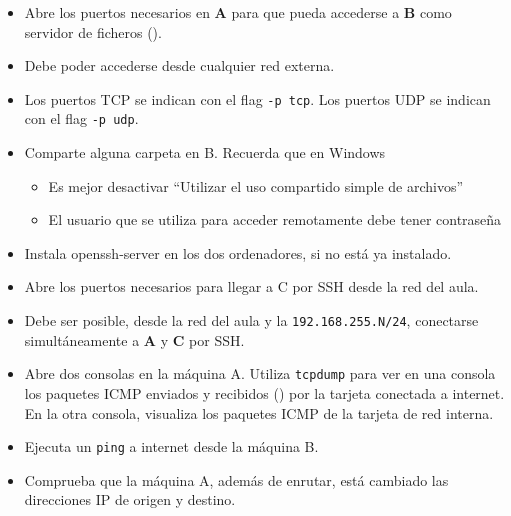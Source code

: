 \begin{homeworkProblem}
  \begin{itemize}
  \item Abre los puertos necesarios en \textbf{A} para que pueda accederse a \textbf{B} como servidor de ficheros ().
  \item Debe poder accederse desde cualquier red externa.
  \item  Los puertos TCP se indican con el flag \texttt{-p tcp}. Los puertos UDP se indican con el flag \texttt{-p udp}.
    
  \item Comparte alguna carpeta en B. Recuerda que en Windows
    \begin{itemize}
    \item Es mejor desactivar “Utilizar el uso compartido simple de archivos”
    \item El usuario que se utiliza para acceder remotamente debe tener contraseña
    \end{itemize}

  \end{itemize}

\end{homeworkProblem}


\begin{homeworkProblem}
  \begin{itemize}
  \item Instala openssh-server en los dos ordenadores, si no está ya instalado.
  \item Abre los puertos necesarios para llegar a C por SSH desde la red del aula.
    
  \item Debe ser posible, desde la red del aula y la \texttt{192.168.255.N/24}, conectarse simultáneamente a \textbf{A} y \textbf{C} por SSH.
  \end{itemize}
\end{homeworkProblem}

\begin{homeworkProblem}
  \begin{itemize}
  \item Abre dos consolas en la máquina A. Utiliza \texttt{tcpdump} para ver en una consola los paquetes ICMP enviados y recibidos () por la tarjeta conectada a internet. En la otra consola, visualiza los paquetes ICMP de la tarjeta de red interna.
  \item Ejecuta un \texttt{ping} a internet desde la máquina B.
  \item Comprueba que la máquina A, además de enrutar, está cambiado las direcciones IP de origen y destino.
  \end{itemize}
\end{homeworkProblem}


